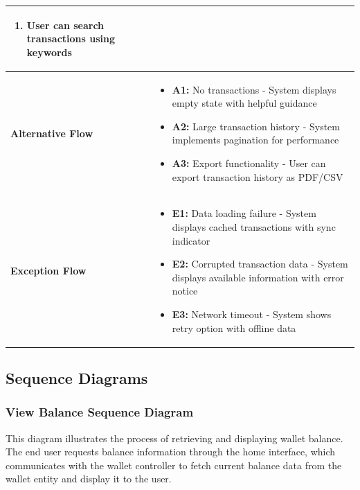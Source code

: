 \begin{longtable}{|p{3cm}|p{11cm}|}
\begin{enumerate}[nosep,leftmargin=*]
\item User can search transactions using keywords
\end{enumerate} \\
\hline
\textbf{Alternative Flow} & 
\begin{itemize}[nosep,leftmargin=*]
\item \textbf{A1:} No transactions - System displays empty state with helpful guidance
\item \textbf{A2:} Large transaction history - System implements pagination for performance
\item \textbf{A3:} Export functionality - User can export transaction history as PDF/CSV
\end{itemize} \\
\hline
\textbf{Exception Flow} & 
\begin{itemize}[nosep,leftmargin=*]
\item \textbf{E1:} Data loading failure - System displays cached transactions with sync indicator
\item \textbf{E2:} Corrupted transaction data - System displays available information with error notice
\item \textbf{E3:} Network timeout - System shows retry option with offline data
\end{itemize} \\
\hline
\end{longtable}

\subsection{Sequence Diagrams}

\subsubsection{View Balance Sequence Diagram}

This diagram illustrates the process of retrieving and displaying wallet balance. The end user requests balance information through the home interface, which communicates with the wallet controller to fetch current balance data from the wallet entity and display it to the user.

